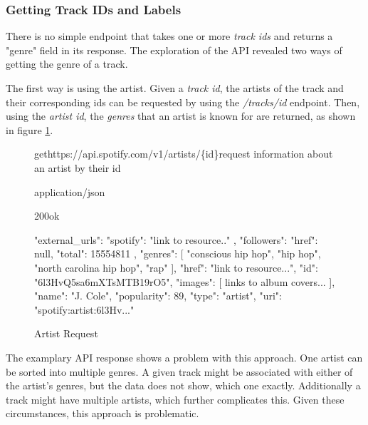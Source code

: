 \subsubsection{Getting Track IDs and Labels}

There is no simple endpoint that takes one or more \emph{track ids} and returns  a "genre" field
in its response. The exploration of the API revealed two ways of getting the genre of a track. 

The first way is using the artist. Given a \emph{track id}, the artists of the track and their corresponding
ids can be requested by using the \emph{/tracks/{id}} endpoint. Then, using the \emph{artist id}, the \emph{genres} that an
artist is known for are returned, as shown in figure \ref{fig:Artist Request}.

\begin{figure}[H]
    \caption{Artist Request}
	\label{fig:Artist Request}
\begin{apiRoute}{get}{https://api.spotify.com/v1/artists/\{id\}}{request information about an artist by their id}
    \begin{routeParameter}
    \end{routeParameter}
    \begin{routeResponse}{application/json}
        \begin{routeResponseItem}{200}{ok}
            \begin{routeResponseItemBody}
{
    "external_urls": {
        "spotify": "link to resource.."
    },
    "followers": {
        "href": null,
        "total": 15554811
    },
    "genres": [
        "conscious hip hop",
        "hip hop",
        "north carolina hip hop",
        "rap"
    ],
    "href": "link to resource...",
    "id": "6l3HvQ5sa6mXTsMTB19rO5",
    "images": [ links to album covers... ],
    "name": "J. Cole",
    "popularity": 89,
    "type": "artist",
    "uri": "spotify:artist:6l3Hv..."
}
            \end{routeResponseItemBody}
        \end{routeResponseItem}
    \end{routeResponse}
\end{apiRoute}
\end{figure}

The examplary API response shows a problem with this approach. One artist can be sorted
into multiple genres.
A given track might be associated with either of the artist's genres, but the data does
not show, which one exactly.
Additionally a track might have multiple artists, which further complicates this.
Given these circumstances, this approach is problematic.

